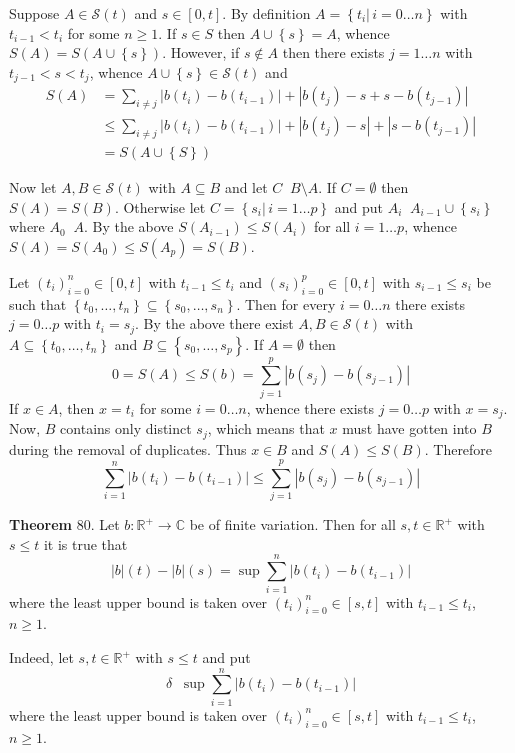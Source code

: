 \documentclass[a4paper]{article}
\newcommand{\obj}[1]{\left\{ #1 \right \}}
\newcommand{\clo}[1]{\left [ #1 \right ]}
\newcommand{\brac}[1]{\left ( #1 \right )}
\newcommand{\induc}[1]{\left . #1 \right \vert}
\newcommand{\abs}[1]{\left | #1 \right |}
\newcommand{\Real}{\mathbb{R}}
\newcommand{\Cplx}{\mathbb{C}}
\newcommand{\Scal}{\mathcal{S}}
\newcommand{\defn}{\mathop{\overset{\Delta}{=}}\nolimits}
\begin{document}
Suppose $A\in\Scal\brac{t}$ and $s\in\clo{0,t}$. By definition $A=\obj{\induc{t_i}\,i=0\ldots n}$ with $t_{i-1}<t_i$ for some $n\geq1$. If $s\in S$ then $A\cup \obj{s} = A$, whence $S\brac{A} = S\brac{A\cup \obj{s}}$. However, if $s\notin A$ then there exists $j=1\ldots n$ with $t_{j-1}<s<t_j$, whence $A\cup \obj{s}\in \Scal\brac{t}$ and \begin{align*}S\brac{A} &= \sum_{i\neq j} \abs{b\brac{t_i}-b\brac{t_{i-1}}} + \abs{b\brac{t_j} - s + s - b\brac{t_{j-1}}}\\&\leq \sum_{i\neq j} \abs{b\brac{t_i}-b\brac{t_{i-1}}} + \abs{b\brac{t_j} - s} + \abs{s - b\brac{t_{j-1}}}\\&=S\brac{A\cup \obj{S}}\end{align*}

Now let $A,B\in \Scal\brac{t}$ with $A\subseteq B$ and let $C\defn B\setminus A$. If $C=\emptyset$ then $S\brac{A}=S\brac{B}$. Otherwise let $C=\obj{\induc{s_i}\,i=1\ldots p}$ and put $A_i\defn A_{i-1}\cup\obj{s_i}$ where $A_0\defn A$. By the above $S\brac{A_{i-1}}\leq S\brac{A_i}$ for all $i=1\dots p$, whence $S\brac{A}=S\brac{A_0}\leq S\brac{A_p}=S\brac{B}$.

Let $\brac{t_i}_{i=0}^n\in\clo{0,t}$ with $t_{i-1}\leq t_i$ and $\brac{s_i}_{i=0}^p\in\clo{0,t}$ with $s_{i-1}\leq s_i$ be such that $\obj{t_0,\ldots, t_n}\subseteq \obj{s_0,\ldots, s_n}$. Then for every $i=0\ldots n$ there exists $j=0\ldots p$ with $t_i=s_j$. By the above there exist $A,B\in \Scal\brac{t}$ with $A\subseteq \obj{t_0,\ldots, t_n}$ and $B\subseteq \obj{s_0,\ldots, s_p}$. If $A=\emptyset$ then \[0=S\brac{A}\leq S\brac{b} = \sum_{j=1}^p\abs{b\brac{s_j}-b\brac{s_{j-1}}}\] If $x\in A$, then $x=t_i$ for some $i=0\ldots n$, whence there exists $j=0\ldots p$ with $x=s_j$. Now, $B$ contains only distinct $s_j$, which means that $x$ must have gotten into $B$ during the removal of duplicates. Thus $x\in B$ and $S\brac{A}\leq S\brac{B}$. Therefore \[\sum_{i=1}^n\abs{b\brac{t_i}-b\brac{t_{i-1}}}\leq \sum_{j=1}^p\abs{b\brac{s_j}-b\brac{s_{j-1}}}\]

\label{thm:finite_var_diff}\noindent\textbf{Theorem} 80.
Let $b:\Real^+\to\Cplx$ be of finite variation. Then for all $s,t\in \Real^+$ with $s\leq t$ it is true that \[\abs{b}\brac{t}-\abs{b}\brac{s} = \sup \sum_{i=1}^n \abs{b\brac{t_i}-b\brac{t_{i-1}}}\] where the least upper bound is taken over $\brac{t_i}_{i=0}^n\in\clo{s,t}$ with $t_{i-1}\leq t_i$, $n\geq1$.

Indeed, let $s,t\in \Real^+$ with $s\leq t$ and put \[\delta \defn \sup \sum_{i=1}^n \abs{b\brac{t_i}-b\brac{t_{i-1}}}\] where the least upper bound is taken over $\brac{t_i}_{i=0}^n\in\clo{s,t}$ with $t_{i-1}\leq t_i$, $n\geq1$.
\end{document}

